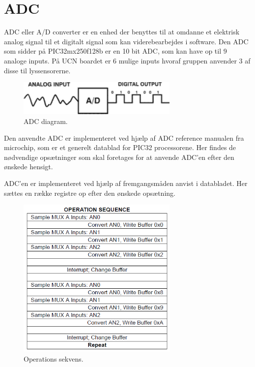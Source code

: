 \section{ADC}
ADC eller A/D converter er en enhed der benyttes til at omdanne et elektrisk analog signal til et digitalt signal som kan viderebearbejdes i software. 
Den ADC som sidder på PIC32mx250f128b \cite{pic32mx} er en 10 bit ADC, som kan have op til 9 analoge inputs. På UCN boardet er 6 mulige inputs hvoraf gruppen  anvender 3 af disse til lyssensorerne. 

\begin{figure}[h!]
  \centering
  \includegraphics[width=0.7\textwidth]{figures/A_D_converter.png}
  \caption{ADC diagram.\cite{ADC_figur}}
  \label{adcDiagram}
\end{figure} 
Den anvendte ADC er implementeret ved hjælp af ADC reference manualen fra microchip, som er et generelt datablad for PIC32 processorene. Her findes de nødvendige opsætninger som skal foretages for at anvende ADC'en efter den ønskede hensigt.
\newline

ADC'en er implementeret ved hjælp af fremgangsmåden anvist i databladet. Her sættes en række registre op efter den ønskede opsætning. 

\begin{figure}[h!]
  \centering
  \includegraphics[width=0.7\textwidth]{figures/operation_sequence.png}
  \caption{Operations sekvens.}
  \label{handlingsekvens}
\end{figure} 

